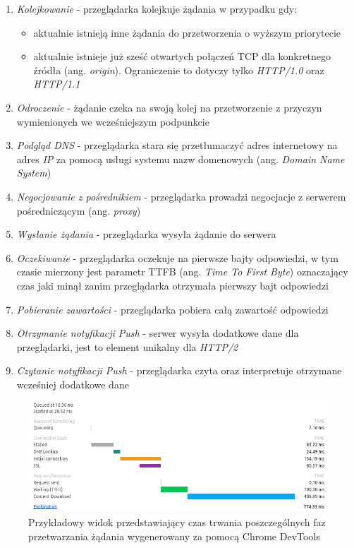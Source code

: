 \documentclass[polish, twoside, 12pt]{mwart}
\begin{document}
\begin{enumerate}
  \item \emph{Kolejkowanie} - przeglądarka kolejkuje żądania w przypadku gdy:
    \begin{itemize}
      \item aktualnie istnieją inne żądania do przetworzenia o wyższym priorytecie
      \item aktualnie istnieje już sześć otwartych połączeń TCP dla konkretnego źródła (ang. \emph{origin}). Ograniczenie to dotyczy tylko \emph{HTTP/1.0} oraz \emph{HTTP/1.1}
    \end{itemize}
  \item \emph{Odroczenie} - żądanie czeka na swoją kolej na przetworzenie z przyczyn wymienionych we wcześniejszym podpunkcie
  \item \emph{Podgląd DNS} - przeglądarka stara się przetłumaczyć adres internetowy na adres \emph{IP} za pomocą usługi systemu nazw domenowych (ang. \emph{Domain Name System})
  \item \emph{Negocjowanie z pośrednikiem} - przeglądarka prowadzi negocjacje z serwerem pośredniczącym (ang. \emph{proxy})
  \item \emph{Wysłanie żądania} - przeglądarka wysyła żądanie do serwera
  \item \emph{Oczekiwanie} - przeglądarka oczekuje na pierwsze bajty odpowiedzi, w tym czasie mierzony jest parametr TTFB (ang. \emph{Time To First Byte}) oznaczający czas jaki minął zanim przeglądarka otrzymała pierwszy bajt odpowiedzi
  \item \emph{Pobieranie zawartości} - przeglądarka pobiera całą zawartość odpowiedzi
  \item \emph{Otrzymanie notyfikacji Push} - serwer wysyła dodatkowe dane dla przeglądarki, jest to element unikalny dla \emph{HTTP/2}
  \item \emph{Czytanie notyfikacji Push} - przeglądarka czyta oraz interpretuje otrzymane wcześniej dodatkowe dane
\end{enumerate}

\begin{figure}[ht]
  \includegraphics[width=\textwidth]{request-timing-chrome.png}
	\caption{Przykładowy widok przedstawiający czas trwania poszczególnych faz przetwarzania żądania wygenerowany za pomocą Chrome DevTools}
\end{figure}
\end{document}
